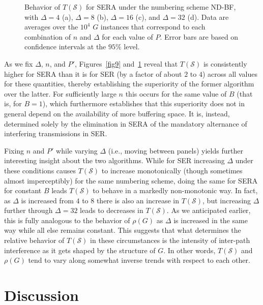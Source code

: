 \documentclass{article}
\begin{document}
\begin{figure}[p]
\centering
{}
\caption{Behavior of $T(\mathcal{S})$ for SERA under the numbering scheme
ND-BF, with $\Delta=4$ (a), $\Delta=8$ (b), $\Delta=16$ (c), and $\Delta=32$
(d). Data are averages over the $10^4$ $G$ instances that correspond to each
combination of $n$ and $\Delta$ for each value of $P$. Error bars are based on
confidence intervals at the $95\%$ level.}
\label{fig10}
\end{figure}

As we fix $\Delta$, $n$, and $P'$, Figures~\ref{fig9} and~\ref{fig10} reveal
that $T(\mathcal{S})$ is consistently higher for SERA than it is for SER (by a
factor of about $2$ to $4$) across all values for these quantities, thereby
establishing the superiority of the former algorithm over the latter. For
sufficiently large $n$ this occurs for the same value of $B$ (that is, for
$B=1$), which furthermore establishes that this superiority does not in general
depend on the availability of more buffering space. It is, instead, determined
solely by the elimination in SERA of the mandatory alternance of interfering
transmissions in SER.

Fixing $n$ and $P'$ while varying $\Delta$ (i.e., moving between panels) yields
further interesting insight about the two algorithms. While for SER increasing
$\Delta$ under these conditions causes $T(\mathcal{S})$ to increase
monotonically (though sometimes almost imperceptibly) for the same numbering
scheme, doing the same for SERA for constant $B$ leads $T(\mathcal{S})$ to
behave in a markedly non-monotonic way. In fact, as $\Delta$ is increased from
$4$ to $8$ there is also an increase in $T(\mathcal{S})$, but increasing
$\Delta$ further through $\Delta=32$ leads to decreases in $T(\mathcal{S})$.
As we anticipated earlier, this is fully analogous to the behavior of $\rho(G)$
as $\Delta$ is increased in the same way while all else remains constant. This
suggests that what determines the relative behavior of $T(\mathcal{S})$ in
these circumstances is the intensity of inter-path interference as it gets
shaped by the structure of $G$. In other words, $T(\mathcal{S})$ and $\rho(G)$
tend to vary along somewhat inverse trends with respect to each other.

\section{Discussion}\label{sec:disc}
\end{document}

